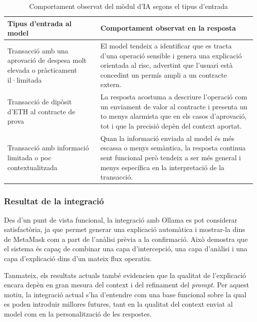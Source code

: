 \begin{table}[H]
\centering
\renewcommand{\arraystretch}{1.2}
\begin{tabularx}{\textwidth}{X X}
\hline
\textbf{Tipus d'entrada al model} & \textbf{Comportament observat en la resposta} \\
\hline
Transacció amb una aprovació de despesa molt elevada o pràcticament il·limitada &
El model tendeix a identificar que es tracta d'una operació sensible i genera una explicació orientada al risc, advertint que l'usuari està concedint un permís ampli a un contracte extern. \\

Transacció de dipòsit d'ETH al contracte de prova &
La resposta acostuma a descriure l'operació com un enviament de valor al contracte i presenta un to menys alarmista que en els casos d'aprovació, tot i que la precisió depèn del context aportat. \\

Transacció amb informació limitada o poc contextualitzada &
Quan la informació enviada al model és més escassa o menys semàntica, la resposta continua sent funcional però tendeix a ser més general i menys específica en la interpretació de la transacció. \\
\hline
\end{tabularx}
\caption{Comportament observat del mòdul d'IA segons el tipus d'entrada}
\label{tab:ia_comportament}
\end{table}



\subsubsection{Resultat de la integració}

Des d’un punt de vista funcional, la integració amb Ollama es pot considerar satisfactòria, ja que permet generar una explicació automàtica i mostrar-la dins de MetaMask com a part de l’anàlisi prèvia a la confirmació. Això demostra que el sistema és capaç de combinar una capa d’intercepció, una capa d’anàlisi i una capa d’explicació dins d’un mateix flux operatiu.

Tanmateix, els resultats actuals també evidencien que la qualitat de l’explicació encara depèn en gran mesura del context i del refinament del \textit{prompt}. Per aquest motiu, la integració actual s’ha d’entendre com una base funcional sobre la qual es poden introduir millores futures, tant en la qualitat del context enviat al model com en la personalització de les respostes.


